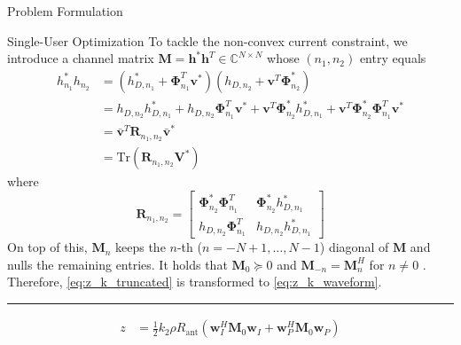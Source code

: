 \documentclass{IEEEtran}
\begin{document}
\begin{section}{Problem Formulation}
\begin{subsection}{Single-User Optimization}
		To tackle the non-convex current constraint, we introduce a channel matrix $\boldsymbol{M}=\boldsymbol{h}^*\boldsymbol{h}^T \in \mathbb{C}^{N \times N}$ whose $(n_1,n_2)$ entry equals
		\begin{equation}
			\begin{split}
				{h_{n_1}^*}{h_{n_2}}
				&=(h_{D,n_1}^*+\boldsymbol{\Phi}_{n_1}^T\boldsymbol{v}^*)(h_{D,n_2}+\boldsymbol{v}^T{\boldsymbol{\Phi}_{n_2}^*})\\
				&={h_{D,n_2}}{h_{D,n_1}^*}+{h_{D,n_2}}\boldsymbol{\Phi}_{n_1}^T\boldsymbol{v}^*+\boldsymbol{v}^T{\boldsymbol{\Phi}_{n_2}^*}h_{D,n_1}^*+\boldsymbol{v}^T{\boldsymbol{\Phi}_{n_2}^*}\boldsymbol{\Phi}_{n_1}^T\boldsymbol{v}^*\\
				&=\bar{\boldsymbol{v}}^T\boldsymbol{R}_{n_1,n_2}\bar{\boldsymbol{v}}^*\\
				&=\mathrm{Tr}(\boldsymbol{R}_{n_1,n_2}\boldsymbol{V}^*)
			\end{split}
		\end{equation}
		where
		\begin{equation}
			\boldsymbol{R}_{n_1,n_2}=
			\begin{bmatrix}
				\boldsymbol{\Phi}_{n_2}^*\boldsymbol{\Phi}_{n_1}^T & \boldsymbol{\Phi}_{n_2}^*{h_{D,n_1}^*} \\
				h_{D,n_2}{\boldsymbol{\Phi}_{n_1}^T}               & h_{D,n_2}{h_{D,n_1}^*}
			\end{bmatrix}
		\end{equation}
		On top of this, $\boldsymbol{M}_n$ keeps the $n$-th ($n=-N+1,\dots,N-1$) diagonal of $\boldsymbol{M}$ and nulls the remaining entries. It holds that $\boldsymbol{M}_0 \succeq 0$ and $\boldsymbol{M}_{-n}=\boldsymbol{M}_{n}^H$ for $n{\ne}0$ \cite{Huang2017}. Therefore, \ref{eq:z_k_truncated} is transformed to \ref{eq:z_k_waveform}.
		\begin{figure*}[b]
			\hrule
			\begin{equation}\label{eq:z_k_waveform}
				\begin{split}
					z
					&=\frac{1}{2}{k_2}{\rho}{R_{\text{ant}}}(\boldsymbol{w}_I^H\boldsymbol{M}_0\boldsymbol{w}_I+\boldsymbol{w}_P^H\boldsymbol{M}_0\boldsymbol{w}_P)\\

\end{split}
\end{equation}
\end{figure*}
\end{subsection}
\end{section}
\end{document}
